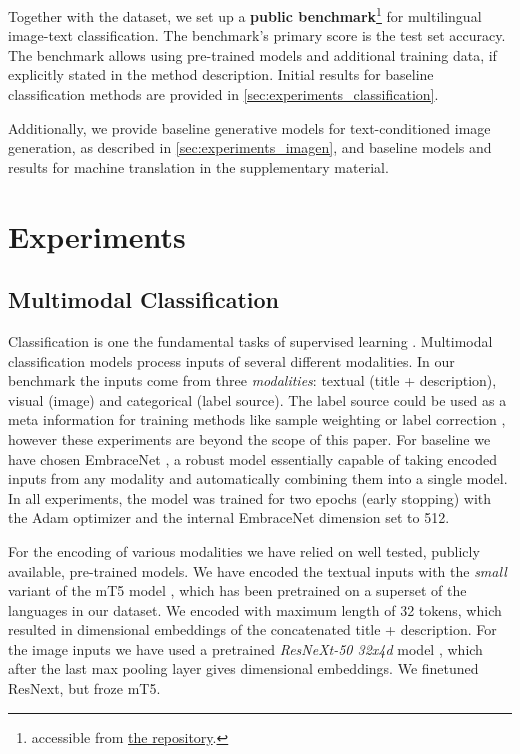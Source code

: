 \documentclass{bmvc2k}
\begin{document}
Together with the dataset, we set up a \textbf{public benchmark}\footnote{\label{note:leaderboard}accessible from \href{https://github.com/glami/glami-1m}{the repository}.} for multilingual image-text  classification. The benchmark's primary score is the test set accuracy. The benchmark allows using pre-trained models and additional training data, if explicitly stated in the method description. Initial results for baseline classification methods are provided in \autoref{sec:experiments_classification}.

Additionally, we provide baseline generative models for text-conditioned image generation, as described in \autoref{sec:experiments_imagen}, and baseline models and results for machine translation in the supplementary material.



\section{Experiments}
\label{sec:experiments}



\subsection{Multimodal Classification}
\label{sec:experiments_classification}
Classification is one the fundamental tasks of supervised learning \cite{sen2020supervised}. Multimodal classification models process inputs of several different modalities. In our benchmark the inputs come from three \emph{modalities}: textual (title + description), visual (image) and categorical (label source). The label source could be used as a meta information for training methods like sample weighting \cite{metaWeightNetLA} or label correction \cite{metaLabelCorrection}, however these experiments are beyond the scope of this paper. For baseline we have chosen EmbraceNet \cite{embracenet}, a robust model essentially capable of taking encoded inputs from any modality and automatically combining them into a single model. In all experiments, the model was trained for two epochs (early stopping) with the Adam optimizer and the internal EmbraceNet dimension set to 512. 

For the encoding of various modalities we have relied on well tested, publicly available, pre-trained models. We have encoded the textual inputs with the \emph{small} variant of the mT5 model \cite{xue-etal-2021-mt5}, which has been pretrained on a superset of the languages in our dataset. We encoded with maximum length of 32 tokens, which resulted in  dimensional embeddings of the concatenated title + description. For the image inputs we have used a pretrained \emph{ResNeXt-50 32x4d} model \cite{resnext}, which after the last max pooling layer gives  dimensional embeddings. We finetuned ResNext, but froze mT5.
\end{document}
